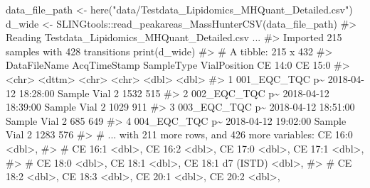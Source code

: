 \documentclass[
  letterpaper,
  DIV=11,
  numbers=noendperiod]{scrreprt}
\newenvironment{Shaded}{\begin{snugshade}}{\end{snugshade}}
\newcommand{\CommentTok}[1]{\textcolor[rgb]{0.37,0.37,0.37}{#1}}
\newcommand{\FunctionTok}[1]{\textcolor[rgb]{0.28,0.35,0.67}{#1}}
\newcommand{\NormalTok}[1]{\textcolor[rgb]{0.00,0.23,0.31}{#1}}
\newcommand{\OtherTok}[1]{\textcolor[rgb]{0.00,0.23,0.31}{#1}}
\newcommand{\SpecialCharTok}[1]{\textcolor[rgb]{0.37,0.37,0.37}{#1}}
\newcommand{\StringTok}[1]{\textcolor[rgb]{0.13,0.47,0.30}{#1}}
\begin{document}
\begin{Shaded}
\begin{Highlighting}[]
\NormalTok{data\_file\_path }\OtherTok{\textless{}{-}} \FunctionTok{here}\NormalTok{(}\StringTok{"data/Testdata\_Lipidomics\_MHQuant\_Detailed.csv"}\NormalTok{)}
\NormalTok{d\_wide }\OtherTok{\textless{}{-}}\NormalTok{ SLINGtools}\SpecialCharTok{::}\FunctionTok{read\_peakareas\_MassHunterCSV}\NormalTok{(data\_file\_path)}
\CommentTok{\#\textgreater{} Reading \textquotesingle{}Testdata\_Lipidomics\_MHQuant\_Detailed.csv\textquotesingle{} ... }
\CommentTok{\#\textgreater{} Imported  215 samples with 428 transitions}
\FunctionTok{print}\NormalTok{(d\_wide)}
\CommentTok{\#\textgreater{} \# A tibble: 215 x 432}
\CommentTok{\#\textgreater{}   DataFileName   AcqTimeStamp        SampleType VialPosition \textasciigrave{}CE 14:0\textasciigrave{} \textasciigrave{}CE 15:0\textasciigrave{}}
\CommentTok{\#\textgreater{}   \textless{}chr\textgreater{}          \textless{}dttm\textgreater{}              \textless{}chr\textgreater{}      \textless{}chr\textgreater{}            \textless{}dbl\textgreater{}     \textless{}dbl\textgreater{}}
\CommentTok{\#\textgreater{} 1 001\_EQC\_TQC p\textasciitilde{} 2018{-}04{-}12 18:28:00 Sample     Vial 2            1532       515}
\CommentTok{\#\textgreater{} 2 002\_EQC\_TQC p\textasciitilde{} 2018{-}04{-}12 18:39:00 Sample     Vial 2            1029       911}
\CommentTok{\#\textgreater{} 3 003\_EQC\_TQC p\textasciitilde{} 2018{-}04{-}12 18:51:00 Sample     Vial 2             685       649}
\CommentTok{\#\textgreater{} 4 004\_EQC\_TQC p\textasciitilde{} 2018{-}04{-}12 19:02:00 Sample     Vial 2            1283       576}
\CommentTok{\#\textgreater{} \# ... with 211 more rows, and 426 more variables: \textasciigrave{}CE 16:0\textasciigrave{} \textless{}dbl\textgreater{},}
\CommentTok{\#\textgreater{} \#   \textasciigrave{}CE 16:1\textasciigrave{} \textless{}dbl\textgreater{}, \textasciigrave{}CE 16:2\textasciigrave{} \textless{}dbl\textgreater{}, \textasciigrave{}CE 17:0\textasciigrave{} \textless{}dbl\textgreater{}, \textasciigrave{}CE 17:1\textasciigrave{} \textless{}dbl\textgreater{},}
\CommentTok{\#\textgreater{} \#   \textasciigrave{}CE 18:0\textasciigrave{} \textless{}dbl\textgreater{}, \textasciigrave{}CE 18:1\textasciigrave{} \textless{}dbl\textgreater{}, \textasciigrave{}CE 18:1 d7 (ISTD)\textasciigrave{} \textless{}dbl\textgreater{},}
\CommentTok{\#\textgreater{} \#   \textasciigrave{}CE 18:2\textasciigrave{} \textless{}dbl\textgreater{}, \textasciigrave{}CE 18:3\textasciigrave{} \textless{}dbl\textgreater{}, \textasciigrave{}CE 20:1\textasciigrave{} \textless{}dbl\textgreater{}, \textasciigrave{}CE 20:2\textasciigrave{} \textless{}dbl\textgreater{},}

\end{Highlighting}
\end{Shaded}
\end{document}
